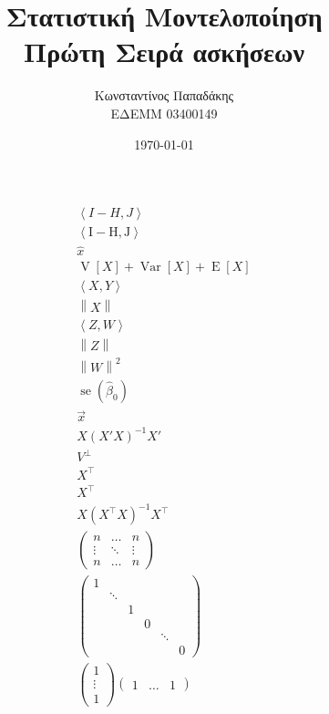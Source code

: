 \documentclass{article}
\title{\textbf{Στατιστική Μοντελοποίηση} \\ Πρώτη Σειρά ασκήσεων}
\author{Κωνσταντίνος Παπαδάκης\\\scriptsize{ΕΔΕΜΜ 03400149}}
\date{\today}
\DeclareMathOperator{\E}{\mathrm{E}}
\DeclareMathOperator{\V}{\mathrm{V}}
\DeclareMathOperator{\Var}{\mathrm{Var}}
\DeclareMathOperator{\se}{\mathrm{se}}
\newcommand{\inner}[2]{\left\langle #1 \mathrel{,} #2 \right\rangle}
\newcommand{\norm}[1]{\left\| #1 \right\|}
\newcommand{\T}[1]{{#1}^{\top}}  %
\begin{document}
\begin{titlepage}
    \maketitle
\end{titlepage}

\begin{gather*}
    \left\langle I - H \mathrel{,} J \right\rangle \\
    \left\langle \mathrm{I} - \mathrm{H} \mathrel{,} \mathrm{J} \right\rangle \\
    \hat{x}\\
    \V[X] + \Var[X] + \E[X]\\
    \inner{X}{Y}\\
    \norm{X}\\
    \inner{Z}{W}\\
    \norm{Z}\\
    \norm{W}^2\\
    \se(\hat{\beta}_0)\\
    \vec{x}\\
    X (X'X)^{-1} X'\\
    V^\bot\\
    X^{\top}\\
    X^{\intercal}\\
    X (\T{X} X)^{-1} \T{X}\\
    \begin{pmatrix}
        n & \dots & n\\
        \vdots & \ddots & \vdots\\
        n & \dots & n
    \end{pmatrix}\\
    \begin{pmatrix}
        1 & & & & &\\
         & \ddots & & & &\\
         & & 1 & & &\\
         & & & 0 & &\\
         & & & & \ddots &\\
         & & & & & 0
    \end{pmatrix}\\
    \begin{pmatrix}
        1 \\ \vdots \\ 1
    \end{pmatrix}
    \begin{pmatrix}
        1 & \dots & 1
    \end{pmatrix}

\end{gather*}
\end{document}
